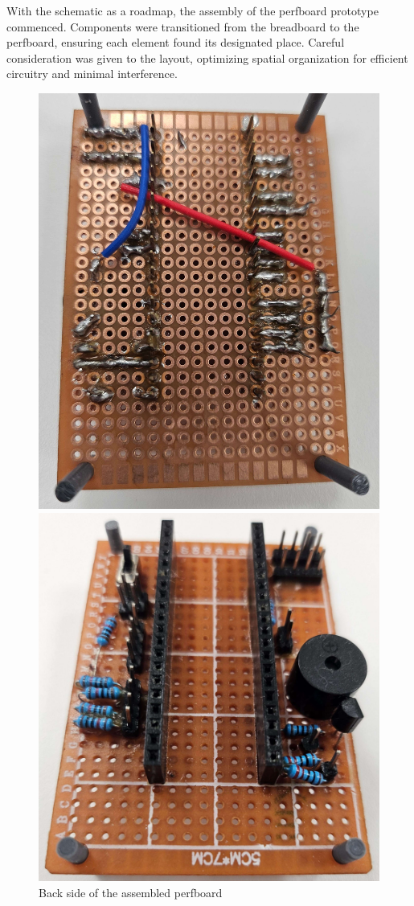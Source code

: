 With the schematic as a roadmap, the assembly of the perfboard prototype commenced. Components were 
transitioned from the breadboard to the perfboard, ensuring each element found its designated place. 
Careful consideration was given to the layout, optimizing spatial organization for efficient circuitry 
and minimal interference.

\begin{figure}[h]
    \centering
    \begin{minipage}[b]{0.45\textwidth}
        \centering
        \includegraphics[width=.8\textwidth]{Imagenes/Vectorial/perfboard_assembled_back.pdf}
        \caption{Back side of the assembled perfboard}
        \label{fig:perfboard_assembled_back}
    \end{minipage}
    \hfill
    \begin{minipage}[b]{0.45\textwidth}
        \centering
        \includegraphics[width=.8\textwidth]{Imagenes/Vectorial/perfboard_assembled_front.pdf}

\end{minipage}
\end{figure}
